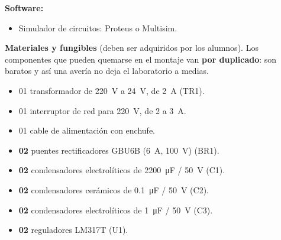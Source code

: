 \documentclass[11pt,a4paper]{article}
\begin{document}
\noindent\textbf{Software:}
\begin{itemize}
    \item Simulador de circuitos: Proteus o Multisim.
\end{itemize}

\vspace{0.25cm}
\noindent\textbf{Materiales y fungibles} (deben ser adquiridos por los alumnos). Los
componentes que pueden quemarse en el montaje van \textbf{por duplicado}: son baratos y
así una avería no deja el laboratorio a medias.
\begin{itemize}
    \item 01 transformador de \qty{220}{\volt} a \qty{24}{\volt}, de \qty{2}{\ampere}
          (TR1).
    \item 01 interruptor de red para \qty{220}{\volt}, de 2 a \qty{3}{\ampere}.
    \item 01 cable de alimentación con enchufe.
    \item \textbf{02} puentes rectificadores GBU6B (\qty{6}{\ampere}, \qty{100}{\volt})
          (BR1).
    \item \textbf{02} condensadores electrolíticos de \qty{2200}{\micro\farad} /
          \qty{50}{\volt} (C1).
    \item \textbf{02} condensadores cerámicos de \qty{0.1}{\micro\farad} /
          \qty{50}{\volt} (C2).
    \item \textbf{02} condensadores electrolíticos de \qty{1}{\micro\farad} /
          \qty{50}{\volt} (C3).
    \item \textbf{02} reguladores LM317T (U1).

\end{itemize}
\end{document}
